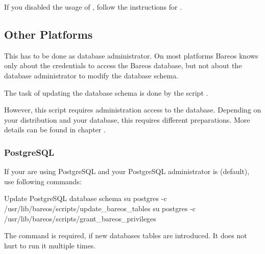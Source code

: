If you disabled the usage of , 
follow the instructions for .

\subsection{Other Platforms}
    \label{sec:UpdateDatabaseOtherDistributions}

This has to be done as database administrator.
On most platforms Bareos knows only about the credentials to access the Bareos database,
but not about the database administrator to modify the database schema.

The task of updating the database schema is done by the script
.

However, this script requires administration access to the database.
Depending on your distribution and your database, this requires different preparations.
More details can be found in chapter .


\subsubsection{PostgreSQL}
If your are using PostgreSQL and your PostgreSQL administrator is  (default), use following commands:

\begin{commands}{Update PostgreSQL database schema}
su postgres -c /usr/lib/bareos/scripts/update_bareos_tables
su postgres -c /usr/lib/bareos/scripts/grant_bareos_privileges
\end{commands}

The  command is required, if new databases tables are introduced. It does not hurt to run it multiple times.

